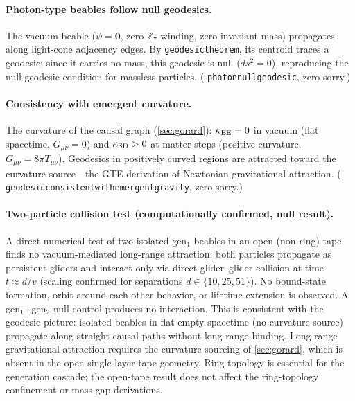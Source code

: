 \documentclass[11pt]{article}
\theoremstyle{remark}
\newcommand{\lean}[1]{%
  \penalty-100
  \begingroup\def\_{\textunderscore\allowbreak}\texttt{#1}\endgroup}
\newcommand{\CatA}{computationally confirmed}
\begin{document}
\paragraph{Photon-type beables follow null geodesics.}
The vacuum beable ($\psi = \mathbf{0}$, zero $\mathbb{Z}_7$ winding,
zero invariant mass) propagates along light-cone adjacency edges.
By \lean{geodesic\_theorem}, its centroid traces a geodesic; since
it carries no mass, this geodesic is null ($ds^2 = 0$), reproducing
the null geodesic condition for massless particles.
(\lean{photon\_null\_geodesic}, zero sorry.)

\paragraph{Consistency with emergent curvature.}
The curvature of the causal graph (\cref{sec:gorard}): $\kappa_{\rm EE} = 0$
in vacuum (flat spacetime, $G_{\mu\nu} = 0$) and $\kappa_{\rm SD} > 0$ at
matter steps (positive curvature, $G_{\mu\nu} = 8\pi T_{\mu\nu}$).
Geodesics in positively curved regions are attracted toward the curvature
source---the GTE derivation of Newtonian gravitational attraction.
(\lean{geodesic\_consistent\_with\_emergent\_gravity}, zero sorry.)

\paragraph{Two-particle collision test (\CatA, null result).}
A direct numerical test of two isolated gen$_1$ beables in an open (non-ring)
tape finds no vacuum-mediated long-range attraction: both particles propagate
as persistent gliders and interact only via direct glider--glider collision
at time $t \approx d/v$ (scaling confirmed for separations $d \in \{10, 25, 51\}$).
No bound-state formation, orbit-around-each-other behavior, or lifetime
extension is observed.
A gen$_1$+gen$_2$ null control produces no interaction.
This is consistent with the geodesic picture: isolated beables in flat empty
spacetime (no curvature source) propagate along straight causal paths without
long-range binding.
Long-range gravitational attraction requires the curvature sourcing of \cref{sec:gorard},
which is absent in the open single-layer tape geometry.
Ring topology is essential for the generation cascade; the open-tape result
does not affect the ring-topology confinement or mass-gap derivations.
\end{document}
